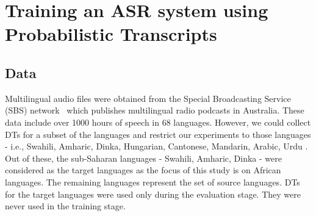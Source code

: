\documentclass[a4paper]{article}
\newcommand{\myvspacesec}{\vspace{-2mm}}
\begin{document}

\myvspacesec
\section{Training an ASR system using Probabilistic Transcripts}  \vspace{-2mm}
\label{sec:ASR Steps}
\subsection{Data} \vspace{-1mm}
Multilingual audio files were obtained from the Special Broadcasting Service (SBS) network~\cite{SBS} which publishes multilingual radio podcasts in Australia. These data include over 1000 hours of speech in 68 languages. However, we could collect DTs for a subset of the languages and restrict our experiments to those languages - i.e., Swahili, Amharic, Dinka, Hungarian, Cantonese, Mandarin, Arabic, Urdu . Out of these, the sub-Saharan languages - Swahili, Amharic, Dinka - were considered as the target languages as the focus of this study is on African languages. The remaining languages represent the set of source languages. DTs for the target languages were used only during the evaluation stage. They were never used in the training stage.
\end{document}
